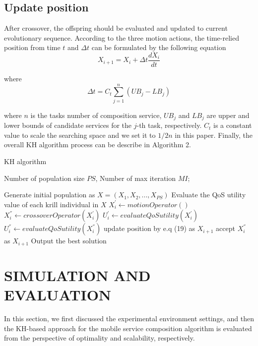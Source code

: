 \documentclass[10pt,journal,compsoc]{IEEEtran}
\begin{document}
\subsection{Update position}
After crossover, the offspring should be evaluated and updated to current evolutionary sequence.
According to the three motion actions, the time-relied position from time $t$ and $\Delta t$ can be formulated by the following equation
\begin{equation}
X_{i+1} = X_i + \Delta t \frac{dX_i}{dt}
\end{equation}

where
\begin{equation}
\Delta t = C_t\sum_{j=1}^{n}(UB_j - LB_j)
\end{equation}

where $n$ is the tasks number of composition service, $UB_j$ and $LB_j$ are upper and lower bounds of candidate services for the $j$-th task, respectively. $C_t$ is a constant value to scale the searching space and we set it to $1/2n$ in this paper. Finally, the overall KH algorithm process can be describe in Algorithm 2.

\begin{algorithm}
\caption{KH algorithm}
\label{alg2}
\begin{algorithmic}[1]

\REQUIRE Number of population size $PS$, Number of max iteration $MI$;

\STATE Generate initial population as $X = (X_1, X_2, ..., X_{PS})$
\STATE Evaluate the QoS utility value of each krill individual in $X$
		\STATE $X_i^{'} \leftarrow motionOperator()$
		\STATE $X_i^{''} \leftarrow crossoverOperator(X_i^{'})$
		\STATE $U_i^{'} \leftarrow evaluateQoSutility(X_i^{'})$
		\STATE $U_i^{''} \leftarrow evaluateQoSutility(X_i^{''})$
			\STATE update position by e.q (19) as $X_{i+1}$
		\ELSE
			\STATE accept $X_i^{''}$ as $X_{i+1}$
		\ENDIF
	\ENDFOR
\ENDFOR
\STATE Output the best solution
\end{algorithmic}
\end{algorithm}

\section{SIMULATION AND EVALUATION}
In this section, we first discussed the experimental environment settings, and then the KH-based approach for the mobile service composition algorithm is evaluated from the perspective of optimality and scalability, respectively.
\end{document}
